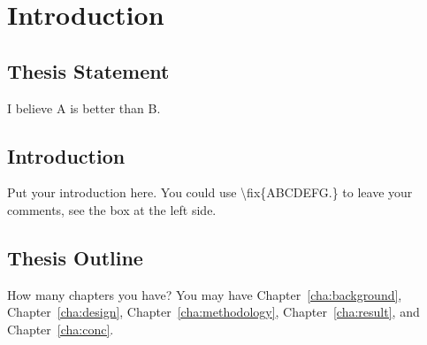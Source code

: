 \chapter{Introduction}
\label{cha:intro}


\section{Thesis Statement}
\label{sec:thesisstatement}
I believe A is better than B.

\section{Introduction}
\label{sec:problemstatement}
Put your introduction here. You could use \textbackslash fix\{ABCDEFG.\} to
leave your comments, see the box at the left side.  \\

\section{Thesis Outline}
\label{sec:outline}
How many chapters you have? You may have Chapter~\ref{cha:background},
Chapter~\ref{cha:design}, Chapter~\ref{cha:methodology},
Chapter~\ref{cha:result}, and Chapter~\ref{cha:conc}.